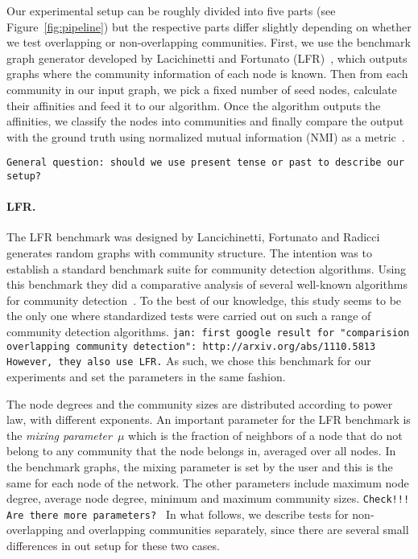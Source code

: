 Our experimental setup can be roughly divided into five parts (see Figure~\ref{fig:pipeline}) but the 
respective parts differ slightly depending on whether we test overlapping or non-overlapping 
communities. First, we use the benchmark graph generator developed by Lacichinetti and Fortunato 
(LFR)~\cite{LFR08, LF09}, which outputs graphs where the community information of each node 
is known. Then from each community in our input graph, we pick a fixed number of seed nodes, 
calculate their affinities and feed it to our algorithm. Once the algorithm outputs the 
affinities, we classify the nodes into communities and finally compare the output 
with the ground truth using normalized mutual information (NMI) as a metric~\cite{DDDA05}.

\texttt{General question: should we use present tense or past to describe our setup?}

\paragraph{LFR.}
The LFR benchmark was designed by Lancichinetti, Fortunato and Radicci~\cite{LFR08}
generates random graphs with community structure. The intention was to establish a 
standard benchmark suite for community detection algorithms. Using this benchmark they 
did a comparative analysis of several well-known algorithms
for community detection~\cite{LF09}. To the best of our knowledge, this study seems to be the 
only one where standardized tests were carried out on such a range of community detection algorithms. 
\texttt{jan: first google result for "comparision overlapping community detection":
http://arxiv.org/abs/1110.5813 However, they also use LFR.}
As such, we chose this benchmark for our experiments and set the parameters in the same fashion. 

The node degrees and the community sizes are distributed according to power law, with 
different exponents. An important parameter for the LFR benchmark is the 
\emph{mixing parameter~$\mu$} which is the fraction of neighbors 
of a node that do not belong to any community that the node belongs in, averaged over all nodes.
In the benchmark graphs, the mixing parameter is set by the user and this is the same for each 
node of the network. The other parameters include maximum node degree, average node degree, 
minimum and maximum community sizes. 
\texttt{Check!!! Are there more parameters? }
In what follows, we describe tests for non-overlapping and overlapping communities separately, since 
there are several small differences in out setup for these two cases. 

